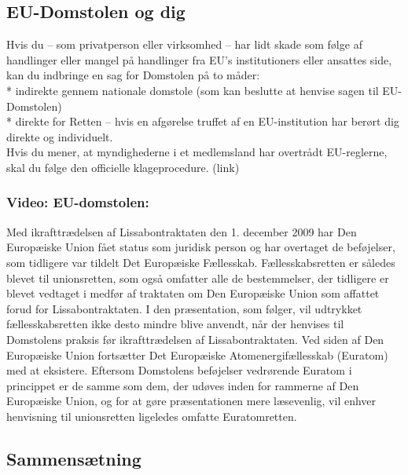 \documentclass[]{book}
\begin{document}
\hypertarget{eu-domstolen-og-dig}{%
\subsection{EU-Domstolen og dig}\label{eu-domstolen-og-dig}}

Hvis du -- som privatperson eller virksomhed -- har lidt skade som følge af handlinger eller mangel på handlinger fra EU's institutioners eller ansattes side, kan du indbringe en sag for Domstolen på to måder:\\
* indirekte gennem nationale domstole (som kan beslutte at henvise sagen til EU-Domstolen)\\
* direkte for Retten -- hvis en afgørelse truffet af en EU-institution har berørt dig direkte og individuelt.\\
Hvis du mener, at myndighederne i et medlemsland har overtrådt EU-reglerne, skal du følge den officielle klageprocedure. (link)

\hypertarget{video-eu-domstolen}{%
\subsubsection{Video: EU-domstolen:}\label{video-eu-domstolen}}

Med ikrafttrædelsen af Lissabontraktaten den 1. december 2009 har Den Europæiske Union fået status som juridisk person og har overtaget de beføjelser, som tidligere var tildelt Det Europæiske Fællesskab. Fællesskabsretten er således blevet til unionsretten, som også omfatter alle de bestemmelser, der tidligere er blevet vedtaget i medfør af traktaten om Den Europæiske Union som affattet forud for Lissabontraktaten. I den præsentation, som følger, vil udtrykket fællesskabsretten ikke desto mindre blive anvendt, når der henvises til Domstolens praksis før ikrafttrædelsen af Lissabontraktaten.
Ved siden af Den Europæiske Union fortsætter Det Europæiske Atomenergifællesskab (Euratom) med at eksistere. Eftersom Domstolens beføjelser vedrørende Euratom i princippet er de samme som dem, der udøves inden for rammerne af Den Europæiske Union, og for at gøre præsentationen mere læsevenlig, vil enhver henvisning til unionsretten ligeledes omfatte Euratomretten.

\hypertarget{sammenstning-1}{%
\subsection{Sammensætning}\label{sammenstning-1}}
\end{document}
